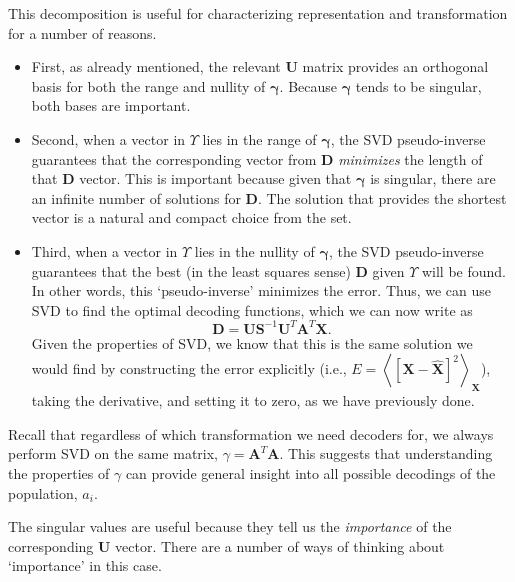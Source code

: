 \documentclass[10pt,letterpaper,oneside]{article}
\begin{document}
This decomposition is useful for characterizing representation and
transformation for a number of reasons. 
\begin{itemize}
\item First, as already mentioned, the relevant $\mathbf{U}$ matrix provides
an orthogonal basis for both the range and nullity of $\boldsymbol{\gamma}$.
Because $\boldsymbol{\gamma}$ tends to be singular, both bases are
important. 
\item Second, when a vector in $\Upsilon$ lies in the range of $\boldsymbol{\gamma}$,
the SVD pseudo-inverse guarantees that the corresponding vector from
$\mathbf{D}$ \emph{minimizes}
the length of that $\mathbf{D}$ vector. This is important
because given that $\boldsymbol{\gamma}$ is singular, there are an
infinite number of solutions for $\mathbf{D}$. The solution
that provides the shortest vector is a natural and compact choice
from the set. 
\item Third, when a vector in $\Upsilon$ lies in the nullity of $\boldsymbol{\gamma}$,
the SVD pseudo-inverse guarantees that the best (in the least squares
sense) $\mathbf{D}$ given $\Upsilon$ will be found. In other
words, this `pseudo-inverse' minimizes the error. Thus, we can use
SVD to find the optimal decoding functions, which we can now write
as
\begin{equation}
  \mathbf{D}=\mathbf{US}^{-1}\mathbf{U}^{T}\mathbf{A}^{T}\mathbf{X}.\label{c4.eq.phi.svd}
\end{equation}
Given the properties of SVD, we know that this is the same solution
we would find by constructing the error explicitly (i.e., $E=\left\langle \left[\mathbf{X}-\hat{\mathbf{X}}\right]^{2}\right\rangle _{\mathbf{X}}$),
taking the derivative, and setting it to zero, as we have previously
done. 
\end{itemize}

Recall that regardless of which transformation we need decoders for,
we always perform SVD on the same matrix, $\gamma=\mathbf{A}^{T}\mathbf{A}$.
This suggests that understanding the properties of $\gamma$ can provide
general insight into all possible decodings of the population, $a_{i}$. 

The singular values are useful because they tell us the \emph{importance}
of the corresponding $\mathbf{U}$ vector. There are a number of ways
of thinking about `importance' in this case. 
\end{document}
